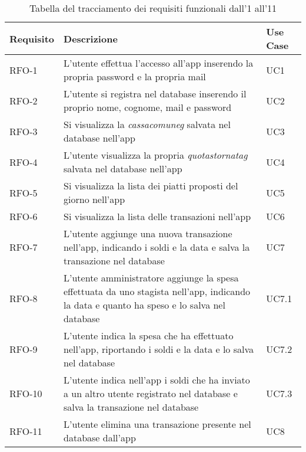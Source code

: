 \begin{table}[htb]%
\caption{Tabella del tracciamento dei requisiti funzionali dall'1 all'11}
\label{tab:requisiti-funzionaliuno}
\begin{tabularx}{\textwidth}{lXl}
\hline
\textbf{Requisito} & \textbf{Descrizione} & \textbf{Use Case}\\
\hline\hline
RFO-1     & L'utente effettua l'accesso all'app inserendo la propria password e la propria mail & UC1 \\
\hline
RFO-2     & L'utente si registra nel database inserendo il proprio nome, cognome, mail e password & UC2 \\
\hline
RFO-3     & Si visualizza la \emph{\gls{cassacomuneg}} salvata nel database nell'app & UC3 \\
\hline
RFO-4     & L'utente visualizza la propria \emph{\gls{quotastornatag}} salvata nel database nell'app & UC4 \\
\hline
RFO-5     & Si visualizza la lista dei piatti proposti del giorno nell'app & UC5 \\
\hline
RFO-6     & Si visualizza la lista delle transazioni nell'app & UC6 \\
\hline
RFO-7     & L'utente aggiunge una nuova transazione nell'app, indicando i soldi e la data e salva la transazione nel database & UC7 \\
\hline
RFO-8     & L'utente amministratore aggiunge la spesa effettuata da uno stagista nell'app, indicando la data e quanto ha speso e lo salva nel database & UC7.1 \\
\hline
RFO-9     & L'utente indica la spesa che ha effettuato nell'app, riportando i soldi e la data e lo salva nel database & UC7.2 \\
\hline
RFO-10    & L'utente indica nell'app i soldi che ha inviato a un altro utente registrato nel database e salva la transazione nel database & UC7.3 \\
\hline
RFO-11    & L'utente elimina una transazione presente nel database dall'app & UC8 \\
\hline
\end{tabularx}
\end{table}%

